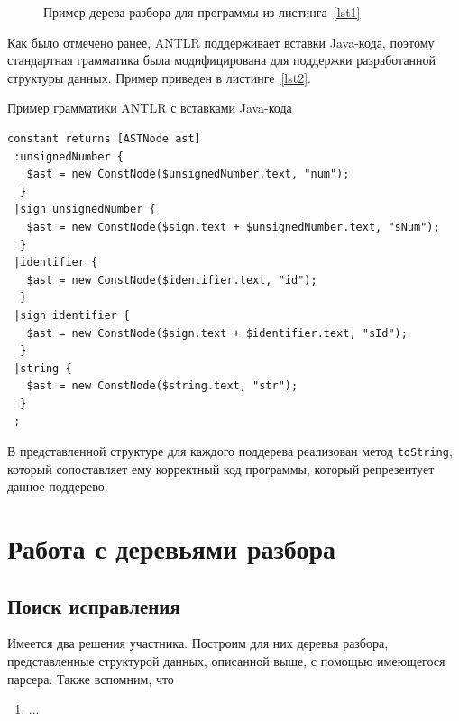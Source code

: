 \begin{figure}[!h] 
\caption{Пример дерева разбора для программы из листинга~\ref{lst1}}\label{fig1} 
\begin{center}
\end{center}
\end{figure}

Как было отмечено ранее, ANTLR поддерживает вставки Java-кода, поэтому стандартная грамматика была модифицирована для поддержки
разработанной структуры данных. Пример приведен в листинге~\ref{lst2}. 

\begin{algorithm}[!h] 
\caption{Пример грамматики ANTLR с вставками Java-кода}\label{lst2} 
\begin{lstlisting}[basicstyle=\small] 
constant returns [ASTNode ast]
 :unsignedNumber {
   $ast = new ConstNode($unsignedNumber.text, "num");
  }
 |sign unsignedNumber {
   $ast = new ConstNode($sign.text + $unsignedNumber.text, "sNum");
  }
 |identifier {
   $ast = new ConstNode($identifier.text, "id");
  }
 |sign identifier {
   $ast = new ConstNode($sign.text + $identifier.text, "sId");
  }
 |string {
   $ast = new ConstNode($string.text, "str");
  }
 ; 
\end{lstlisting} 
\end{algorithm}

В представленной структуре для каждого поддерева реализован метод \texttt{toString}, который сопоставляет ему
корректный код программы, который репрезентует данное поддерево. 

\section{Работа с деревьями разбора}

\subsection{Поиск исправления}

Имеется два решения участника. Построим для них деревья разбора, представленные структурой данных, описанной выше, 
с помощью имеющегося парсера. Также вспомним, что 

\chapterconclusion

\begin{enumerate}
    \item ...
\end{enumerate}
